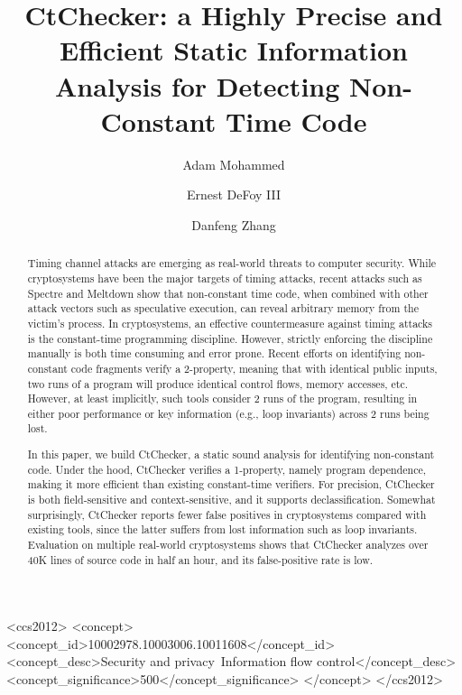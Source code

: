 \documentclass[sigconf, authorversion]{acmart}
\newcommand{\sysname}{CtChecker}
\begin{document}
\title{\sysname: a Highly Precise and Efficient Static Information Analysis for
Detecting Non-Constant Time Code}

\author{Adam Mohammed}

\author{Ernest DeFoy III}

\author{Danfeng Zhang}


\begin{abstract}
Timing channel attacks are emerging as real-world threats to computer security.
While cryptosystems have been the major targets of timing attacks, recent
attacks such as Spectre and Meltdown show that non-constant time code, when
combined with other attack vectors such as speculative execution, can reveal
arbitrary memory from the victim's process.  In cryptosystems, an effective
countermeasure against timing attacks is the constant-time programming
discipline. However, strictly enforcing the discipline manually is both time
consuming and error prone. Recent efforts on identifying non-constant code
fragments verify a 2-property, meaning that with identical public inputs, two
runs of a program will produce identical control flows, memory accesses, etc.
However, at least implicitly, such tools consider 2 runs of the program,
resulting in either poor performance or key information (e.g., loop invariants)
across 2 runs being lost.

In this paper, we build \sysname, a static sound analysis for identifying
non-constant code. Under the hood, \sysname{} verifies a 1-property, namely
program dependence, making it more efficient than existing constant-time
verifiers. For precision, \sysname{} is both field-sensitive and
context-sensitive, and it supports declassification. Somewhat surprisingly,
\sysname{} reports fewer false positives in cryptosystems compared with
existing tools, since the latter suffers from lost information such as loop
invariants. Evaluation on multiple real-world cryptosystems shows that
\sysname{} analyzes over 40K lines of source code in half an hour, and its
false-positive rate is low.
\end{abstract}


%
%
 \begin{CCSXML}
<ccs2012>
<concept>
<concept_id>10002978.10003006.10011608</concept_id>
<concept_desc>Security and privacy~Information flow control</concept_desc>
<concept_significance>500</concept_significance>
</concept>
</ccs2012>
\end{CCSXML}

%
%


\keywords{}



\maketitle









\end{document}
